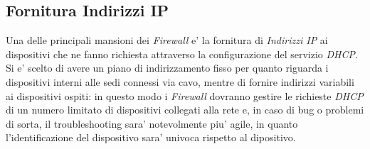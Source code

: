 \documentclass{report}
\begin{document}
        \subsection{Fornitura Indirizzi IP}
            Una delle principali mansioni dei \emph{Firewall} e' la fornitura di \emph{Indirizzi IP} ai dispositivi che ne
             fanno richiesta attraverso la configurazione del servizio \emph{DHCP}. Si e' scelto di avere un piano di
             indirizzamento fisso per quanto riguarda i dispositivi interni alle sedi connessi via cavo, mentre di
             fornire indirizzi variabili ai dispositivi ospiti: in questo modo i \emph{Firewall} dovranno gestire le
             richieste \emph{DHCP} di un numero limitato di dispositivi collegati alla rete e, in caso di bug o
             problemi di sorta, il troubleshooting sara' notevolmente piu' agile, in quanto l'identificazione
             del dispositivo sara' univoca rispetto al dipositivo.
\end{document}
